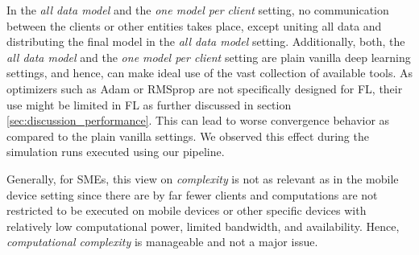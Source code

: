 In the \emph{all data model} and the \emph{one model per client} setting, no communication between the clients or other entities takes place, except uniting all data and distributing the final model in the \emph{all data model} setting. Additionally, both, the \emph{all data model} and the \emph{one model per client} setting are plain vanilla deep learning settings, and hence, can make ideal use of the vast collection of available tools. As optimizers such as Adam or RMSprop are not specifically designed for FL, their use might be limited in FL as further discussed in section \ref{sec:discussion_performance}. This can lead to worse convergence behavior as compared to the plain vanilla settings. We observed this effect during the simulation runs executed using our pipeline.

Generally, for SMEs, this view on \emph{complexity} is not as relevant as in the mobile device setting since there are by far fewer clients and computations are not restricted to be executed on mobile devices or other specific devices with relatively low computational power, limited bandwidth, and availability. Hence, \emph{computational complexity} is manageable and not a major issue.

